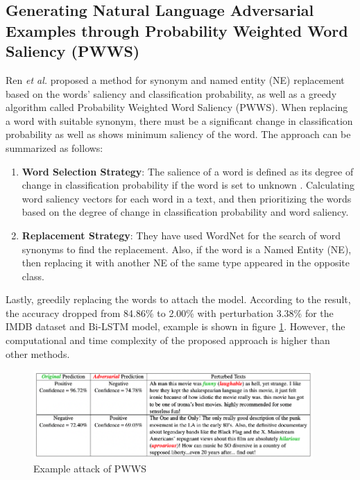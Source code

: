 \documentclass[%
	BCOR=8mm, %
	DIV=12,
	toc=bibliography, %
	toc=listof, %
	oneside, %
	egregdoesnotlikesansseriftitles, %
	]{scrbook}
\begin{document}
\subsection{Generating Natural Language Adversarial Examples through Probability Weighted Word Saliency (PWWS)}
\label{subsection:generatingadversarialexample}
Ren \textit{et al.} \cite{ren_generating_2019} proposed a method for synonym and named entity (NE) replacement based on the words' saliency and classification probability, as well as a greedy algorithm called Probability Weighted Word Saliency (PWWS). When replacing a word with suitable synonym, there must be a significant change in classification probability as well as shows minimum saliency of the word. The approach can be summarized as follows:

\begin{enumerate}
    \item \textbf{Word Selection Strategy}:  
   The salience of a word is defined as its degree of change in classification probability if the word is set to unknown \cite{li_understanding_2017}. Calculating word saliency vectors for each word in a text, and then prioritizing the words based on the degree of change in classification probability and word saliency.  
    \item \textbf{Replacement Strategy}: They have used WordNet for the search of word synonyms to find the replacement. Also, if the word is a Named Entity (NE), then replacing it with another NE of the same type appeared in the opposite class.
\end{enumerate}
Lastly, greedily replacing the words to attach the model. According to the result, the accuracy dropped from 84.86\% to 2.00\% with perturbation 3.38\% for the IMDB dataset and Bi-LSTM model, example is shown in figure \ref{diag:pwwsexp}. However, the computational and time complexity of the proposed approach is higher than other methods.
\begin{figure}[H]
    \centering
    \includegraphics[width=0.95\textwidth]{img/PWWSexample.png}
    \caption[Example of PWWS attack recipe]{Example attack of PWWS\cite{ren_generating_2019} }
    \label{diag:pwwsexp}
\end{figure}
\end{document}
